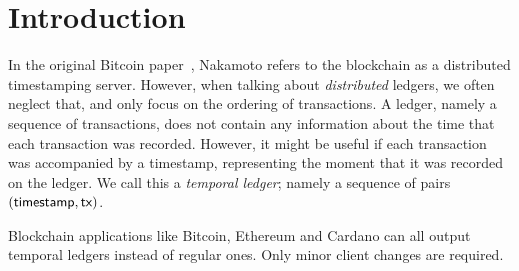 \section{Introduction}
In the original Bitcoin paper~\cite{bitcoin}, Nakamoto refers to the
blockchain as a distributed timestamping server. However, when talking about
\emph{distributed} ledgers, we often neglect that, and only focus on the ordering
of transactions.
A ledger, namely a sequence of transactions, does not contain any information
about the time that each transaction was recorded. However, it might be useful
if each transaction was accompanied by a timestamp, representing the moment
that it was recorded on the ledger. We call this a \emph{temporal ledger};
namely a sequence of pairs $(\textsf{timestamp},\textsf{tx})$.

Blockchain applications like Bitcoin, Ethereum and Cardano
can all output temporal ledgers instead of regular ones. Only
minor client changes are required.


